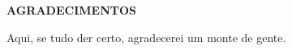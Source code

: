 \newpage
\thispagestyle{plain}
\large
\textbf{AGRADECIMENTOS}

Aqui, se tudo der certo, agradecerei um monte de gente.
